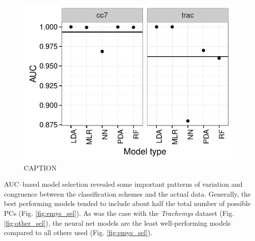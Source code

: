 \documentclass[12pt,letterpaper]{article}
\begin{document}
\begin{figure}[ht]
  \centering
  \includegraphics[height = \textheight, width = \textwidth, keepaspectratio = true]{figure/other_oos_sel}
  \caption{CAPTION}
  \label{fig:other_oos}
\end{figure}


AUC--based model selection revealed some important patterns of variation and congruence between the classification schemes and the actual data. Generally, the best performing models tended to include about half the total number of possible PCs (Fig. \ref{fig:emys_sel}). As was the case with the \textit{Trachemys} dataset (Fig. \ref{fig:other_sel}), the neural net models are the least well-performing models compared to all others used (Fig. \ref{fig:emys_sel}).
\end{document}
